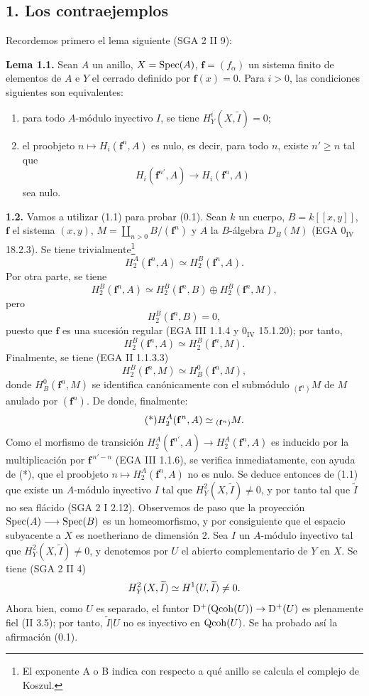 \subsection*{1. Los contraejemplos}
Recordemos primero el lema siguiente (SGA 2 II 9):

\textbf{Lema 1.1.} Sean $A$ un anillo, $X=\Spec(A)$, $\mathbf f=(f_\alpha)$ un sistema finito de elementos de $A$ e $Y$ el cerrado definido por $\mathbf f(x)=0$. Para $i>0$, las condiciones siguientes son equivalentes:
\begin{enumerate}[label=(\roman*)]
\item para todo $A$-módulo inyectivo $I$, se tiene $H^i_Y(X,\widetilde I)=0$;
\item el proobjeto $n\mapsto H_i(\mathbf f^n,A)$ es nulo, es decir, para todo $n$, existe $n'\geq n$ tal que
\[
 H_i(\mathbf f^{n'},A)\longrightarrow H_i(\mathbf f^n,A)
\]
sea nulo.
\end{enumerate}

\textbf{1.2.} Vamos a utilizar (1.1) para probar (0.1). Sean $k$ un cuerpo, $B=k[[x,y]]$, $\mathbf f$ el sistema $(x,y)$, $M=\coprod_{n>0}B/(\mathbf f^n)$ y $A$ la $B$-álgebra $D_B(M)$ (EGA $0_{\mathrm{IV}}$ 18.2.3). Se tiene trivialmente\footnote{El exponente A o B indica con respecto a qué anillo se calcula el complejo de Koszul.}
\[
 H_2^A(\mathbf f^n,A)\simeq H_2^B(\mathbf f^n,A).
\]
Por otra parte, se tiene
\[
 H_2^B(\mathbf f^n,A)\simeq H_2^B(\mathbf f^n,B)\oplus H_2^B(\mathbf f^n,M),
\]
pero
\[
 H_2^B(\mathbf f^n,B)=0,
\]
puesto que $\mathbf f$ es una sucesión regular (EGA III 1.1.4 y $0_{\mathrm{IV}}$ 15.1.20); por tanto,
\[
 H_2^B(\mathbf f^n,A)\simeq H_2^B(\mathbf f^n,M).
\]
Finalmente, se tiene (EGA II 1.1.3.3)
\[
 H_2^B(\mathbf f^n,M)\simeq H_B^0(\mathbf f^n,M),
\]
donde $H_B^0(\mathbf f^n,M)$ se identifica canónicamente con el submódulo ${}_{(\mathbf f^n)}M$ de $M$ anulado por $(\mathbf f^n)$. De donde, finalmente:
\begin{equation}\tag{*}
 H_2^A(\mathbf f^n,A\sisi{}{)}\simeq {}_{(\mathbf f^n)}M.
\end{equation}
Como el morfismo de transición $H_2^A(\mathbf f^{n'},A)\longrightarrow H_2^A(\mathbf f^n,A)$ es inducido por la multiplicación por $\mathbf f^{\,n'-n}$ (EGA III 1.1.6), se verifica inmediatamente, con ayuda de (*), que el proobjeto $n\mapsto H_2^A(\mathbf f^n,A)$ no es nulo. Se deduce entonces de (1.1) que existe un $A$-módulo inyectivo $I$ tal que $H^2_Y(X,\widetilde I)\ne0$, y por tanto tal que $\widetilde I$ no sea flácido (SGA 2 I 2.12). Observemos de paso que la proyección $\Spec(A)\longrightarrow\Spec(B)$ es un homeomorfismo, y por consiguiente que el espacio subyacente a $X$ es noetheriano de dimensión $2$. Sea $I$ un $A$-módulo inyectivo tal que $H^2_Y(X,\widetilde I)\ne0$, y denotemos por $U$ el abierto complementario de $Y$ en $X$. Se tiene (SGA 2 II 4)
\[
 H^2_Y(X,\sisi{I}{\widetilde I})\simeq H^1(U,\sisi{I}{\widetilde I})\ne0.
\]
Ahora bien, como $U$ es separado, el funtor $\mathrm D^+(\Qcoh(U))\to\mathrm D^+(U)$ es plenamente fiel (II 3.5); por tanto, $\widetilde I|U$ no es inyectivo en $\Qcoh(U)$. Se ha probado así la afirmación (0.1).

